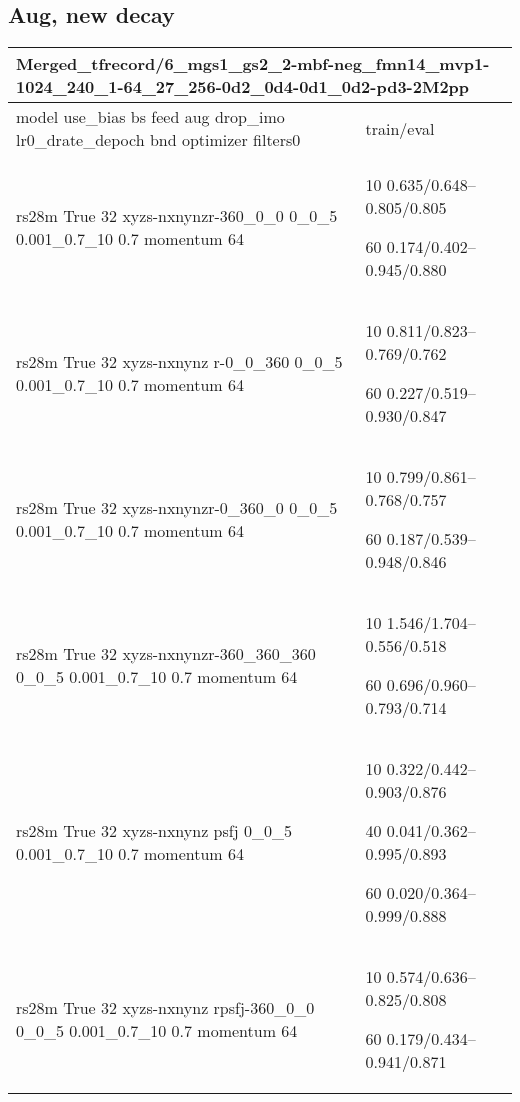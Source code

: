 \documentclass[,table,dvipsnames]{article}
\begin{document}
\subsection{Aug, new decay}
\noindent\begin{tabular}{|p{10cm}|p{5cm}| }	
	\hline
	\multicolumn{2}{|p{15cm}|}{Merged\_tfrecord/6\_mgs1\_gs2\_2-mbf-neg\_fmn14\_mvp1-1024\_240\_1-64\_27\_256-0d2\_0d4-0d1\_0d2-pd3-2M2pp}\\
	\hline
	model use\_bias bs feed aug drop\_imo lr0\_drate\_depoch bnd optimizer filters0 & train/eval \\
	
	\rowcolor{yellow!20}
	rs28m True 32 xyzs-nxnynzr-360\_0\_0 0\_0\_5 0.001\_0.7\_10 0.7 momentum 64& 10 0.635/0.648--0.805/0.805\par 60 0.174/0.402--0.945/0.880\\
	
	\rowcolor{green!20}
	rs28m True 32 xyzs-nxnynz r-0\_0\_360 0\_0\_5 0.001\_0.7\_10 0.7 momentum 64& 10 0.811/0.823--0.769/0.762\par  60 0.227/0.519--0.930/0.847\\
	
	\rowcolor{red!20}
	rs28m True 32 xyzs-nxnynzr-0\_360\_0 0\_0\_5 0.001\_0.7\_10 0.7 momentum 64&10 0.799/0.861--0.768/0.757\par 60 0.187/0.539--0.948/0.846\\
	
	\rowcolor{gray!20}
	rs28m True 32 xyzs-nxnynzr-360\_360\_360 0\_0\_5 0.001\_0.7\_10 0.7 momentum 64& 10 1.546/1.704--0.556/0.518\par 60 0.696/0.960--0.793/0.714\\
	
	\rowcolor{yellow}
	rs28m True 32 xyzs-nxnynz psfj 0\_0\_5 0.001\_0.7\_10 0.7 momentum 64& 10 0.322/0.442--0.903/0.876\par 40 0.041/0.362--0.995/0.893\par 60 0.020/0.364--0.999/0.888\\
	
	\rowcolor{orange!20}
	rs28m True 32 xyzs-nxnynz rpsfj-360\_0\_0 0\_0\_5 0.001\_0.7\_10 0.7 momentum 64& 10 0.574/0.636--0.825/0.808\par 60 0.179/0.434--0.941/0.871\\
	
	
	\hline 
\end{tabular}
\end{document}
